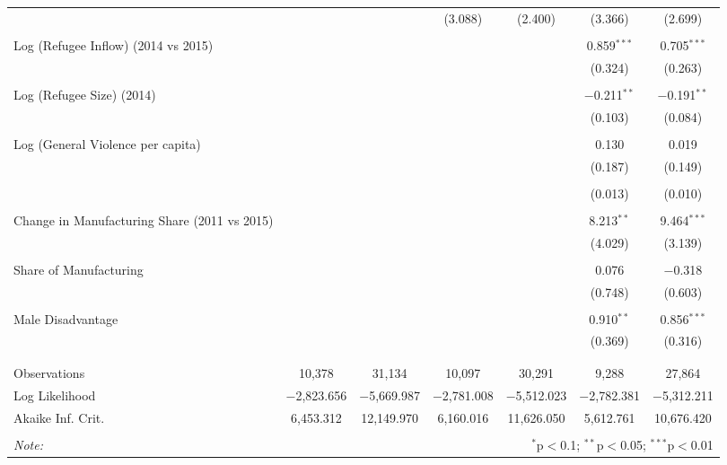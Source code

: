 \begin{table}[!htbp]
\begin{tabular}{@{\extracolsep{5pt}}lcccccc}
  &  &  & (3.088) & (2.400) & (3.366) & (2.699) \\ 
  & & & & & & \\ 
 Log (Refugee Inflow) (2014 vs 2015) &  &  &  &  & 0.859$^{***}$ & 0.705$^{***}$ \\ 
  &  &  &  &  & (0.324) & (0.263) \\ 
  & & & & & & \\ 
 Log (Refugee Size) (2014) &  &  &  &  & $-$0.211$^{**}$ & $-$0.191$^{**}$ \\ 
  &  &  &  &  & (0.103) & (0.084) \\ 
  & & & & & & \\ 
 Log (General Violence per capita) &  &  &  &  & 0.130 & 0.019 \\ 
  &  &  &  &  & (0.187) & (0.149) \\ 
  & & & & & & \\ 
  &  &  &  &  & (0.013) & (0.010) \\ 
  & & & & & & \\ 
 Change in Manufacturing Share (2011 vs 2015) &  &  &  &  & 8.213$^{**}$ & 9.464$^{***}$ \\ 
  &  &  &  &  & (4.029) & (3.139) \\ 
  & & & & & & \\ 
 Share of Manufacturing &  &  &  &  & 0.076 & $-$0.318 \\ 
  &  &  &  &  & (0.748) & (0.603) \\ 
  & & & & & & \\ 
 Male Disadvantage &  &  &  &  & 0.910$^{**}$ & 0.856$^{***}$ \\ 
  &  &  &  &  & (0.369) & (0.316) \\ 
  & & & & & & \\ 
\hline \\[-1.8ex] 
Observations & 10,378 & 31,134 & 10,097 & 30,291 & 9,288 & 27,864 \\ 
Log Likelihood & $-$2,823.656 & $-$5,669.987 & $-$2,781.008 & $-$5,512.023 & $-$2,782.381 & $-$5,312.211 \\ 
Akaike Inf. Crit. & 6,453.312 & 12,149.970 & 6,160.016 & 11,626.050 & 5,612.761 & 10,676.420 \\ 
\hline 
\hline \\[-1.8ex] 
\textit{Note:}  & \multicolumn{6}{r}{$^{*}$p$<$0.1; $^{**}$p$<$0.05; $^{***}$p$<$0.01} \\ 
\end{tabular} 
\end{table} 
